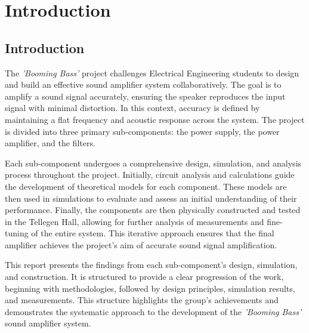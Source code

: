 \chapter{Introduction}
\label{chapter:introduction}
\section{Introduction}

The \emph{'Booming Bass'} project challenges Electrical Engineering students to design and build an effective sound amplifier system collaboratively. The goal is to amplify a sound signal accurately, ensuring the speaker reproduces the input signal with minimal distortion. In this context, accuracy is defined by maintaining a flat frequency and acoustic response across the system. The project is divided into three primary sub-components: the power supply, the power amplifier, and the filters. 

Each sub-component undergoes a comprehensive design, simulation, and analysis process throughout the project. Initially, circuit analysis and calculations guide the development of theoretical models for each component. These models are then used in simulations to evaluate and assess an initial understanding of their performance. Finally, the components are then physically constructed and tested in the Tellegen Hall, allowing for further analysis of measurements and fine-tuning of the entire system. This iterative approach ensures that the final amplifier achieves the project's aim of accurate sound signal amplification.

This report presents the findings from each sub-component's design, simulation, and construction. It is structured to provide a clear progression of the work, beginning with methodologies, followed by design principles, simulation results, and measurements. This structure highlights the group's achievements and demonstrates the systematic approach to the development of the \emph{'Booming Bass'} sound amplifier system.



